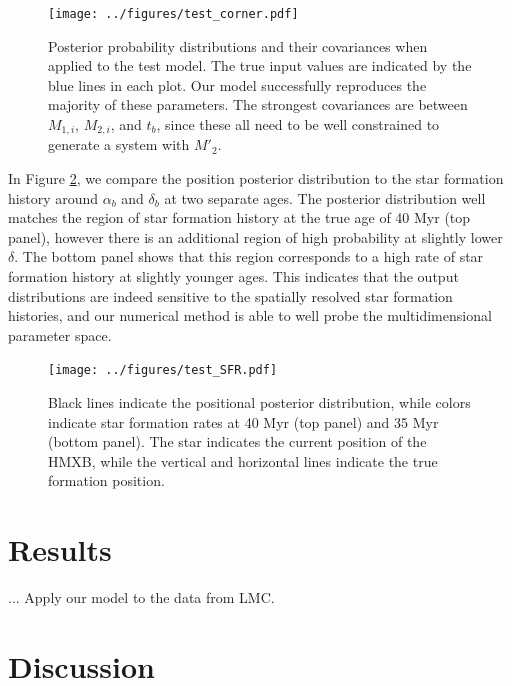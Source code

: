 \documentclass[12pt, preprint]{aastex}
\begin{document}
\begin{figure}[h!]
\begin{center}
\texttt{[image: ../figures/test\_corner.pdf]}
\caption{Posterior probability distributions and their covariances when applied to the test model. The true input values are indicated by the blue lines in each plot. Our model successfully reproduces the majority of these parameters. The strongest covariances are between $M_{1,i}$, $M_{2,i}$, and $t_b$, since these all need to be well constrained to generate a system with $M'_2$. }
\label{fig:test_corner}
\end{center}
\end{figure}


In Figure \ref{fig:test_SFR}, we compare the position posterior distribution to the star formation history around $\alpha_b$ and $\delta_b$ at two separate ages. The posterior distribution well matches the region of star formation history at the true age of 40 Myr (top panel), however there is an additional region of high probability at slightly lower $\delta$. The bottom panel shows that this region corresponds to a high rate of star formation history at slightly younger ages. This indicates that the output distributions are indeed sensitive to the spatially resolved star formation histories, and our numerical method is able to well probe the multidimensional parameter space.


\begin{figure}[h!]
\begin{center}
\texttt{[image: ../figures/test\_SFR.pdf]}
\caption{Black lines indicate the positional posterior distribution, while colors indicate star formation rates at 40 Myr (top panel) and 35 Myr (bottom panel). The star indicates the current position of the HMXB, while the vertical and horizontal lines indicate the true formation position.}
\label{fig:test_SFR}
\end{center}
\end{figure}



\section{Results}

... Apply our model to the data from LMC. 

\section{Discussion}
\end{document}
